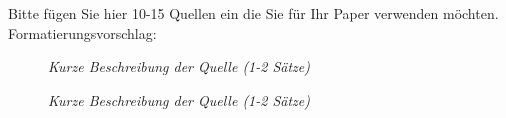 \documentclass[
    ngerman,american
    ]{scrartcl}
\newcommand{\lang}{en}
\begin{document}
      
        \sectionSource{\lang}
        Bitte fügen Sie hier 10-15 Quellen ein die Sie für Ihr Paper verwenden möchten.
        Formatierungsvorschlag:
        
        \begin{description}
        \item[\cite{gruba_how_2017}] \textit{Kurze Beschreibung der Quelle (1-2 Sätze)}
        \item[\cite{zobel_writing_2015}] \textit{Kurze Beschreibung der Quelle (1-2 Sätze)}
        \end{description}
        
        
      \printbibliography
    
\end{document}
